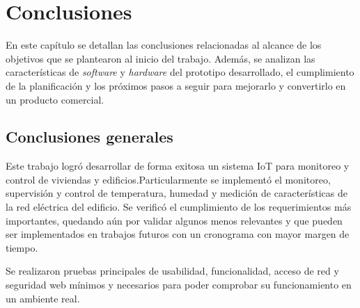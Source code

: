 
\chapter{Conclusiones} %

\label{Chapter5} %

En este capítulo se detallan las conclusiones relacionadas al alcance de los objetivos que se plantearon al inicio del trabajo. Además, se analizan las características de \emph{software} y \emph{hardware} del prototipo desarrollado, el cumplimiento de la planificación y los próximos pasos a seguir para mejorarlo y convertirlo en un producto comercial.




\section{Conclusiones generales }

Este trabajo logró desarrollar de forma exitosa un sistema IoT para monitoreo y control de viviendas y edificios.Particularmente se implementó el monitoreo, supervisión y control de temperatura, humedad y medición de características de la red eléctrica del edificio. Se verificó el cumplimiento de los requerimientos más importantes, quedando aún por validar algunos menos relevantes y que pueden ser implementados en trabajos futuros con un cronograma con mayor margen de tiempo.





Se realizaron pruebas principales de usabilidad, funcionalidad, acceso de red y seguridad web mínimos y necesarios para poder comprobar su funcionamiento en un ambiente real. 


